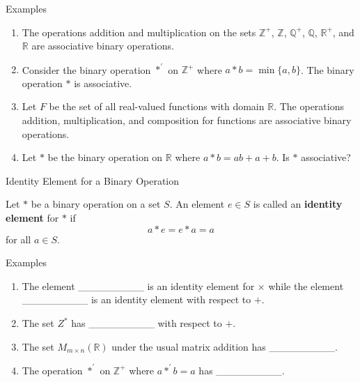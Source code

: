 \documentclass{beamer}
\begin{document}
\begin{frame}{Examples}
\begin{enumerate}
\justifying
\item The operations addition and multiplication on the sets $\mathbb{Z}^+$, $\mathbb{Z}$, $\mathbb{Q}^+$, $\mathbb{Q}$, $\mathbb{R}^+$, and $\mathbb{R}$ are associative binary operations.
\pause
\item Consider the binary operation $*^{\prime}$ on $\mathbb{Z}^+$ where $a * b = \min\{a, b\}$. The binary operation $*$ is associative.
\pause
\item Let $F$ be the set of all real-valued functions with domain $\mathbb{R}$. The operations addition, multiplication, and composition for functions are associative binary operations. 
\pause
\item Let $*$ be the binary operation on $\mathbb{R}$ where $a * b = ab + a + b$. Is $*$ associative? 
\end{enumerate}    
\end{frame}

\begin{frame}{Identity Element for a Binary Operation}
\begin{definition}
\justifying
Let $*$ be a binary operation on a set $S$. An element $e \in S$ is called an \textbf{identity element} for $*$ if $$a * e = e * a  = a$$ for all $a \in S$.
\end{definition}
\end{frame}

\begin{frame}{Examples}
\begin{enumerate}
\justifying
\item The element \_\_\_\_\_\_\_\_\_ is an identity element for $\times$ while the element \_\_\_\_\_\_\_\_\_ is an identity element with respect to $+$. 
\item The set $Z^*$ has \_\_\_\_\_\_\_\_\_ with respect to $+$.
\item The set $M_{m \times n}(\mathbb{R})$ under the usual matrix addition has \_\_\_\_\_\_\_\_\_.
\item The operation $*^{\prime}$ on $\mathbb{Z}^+$ where $a *^{\prime} b = a$ has \_\_\_\_\_\_\_\_\_.  
\end{enumerate}
\end{frame}
\end{document}
